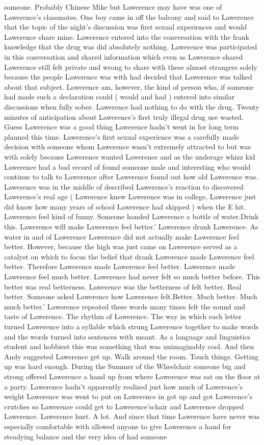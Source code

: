 \documentclass[12pt]{book}
\begin{document}
someone. Probably Chinese Mike but Lawerence may have was one of Lawerence's classmates. One boy came in off the balcony and said to Lawerence that the topic of the night's discussion was first sexual experiences and would Lawerence share mine. Lawerence entered into the conversation with the frank knowledge that the drug was did absolutely nothing. Lawerence was participated in this conversation and shared information which even as Lawerence shared Lawerence still felt private and wrong to share with these almost strangers solely because the people Lawerence was with had decided that Lawerence was talked about that subject. Lawerence am, however, the kind of person who, if someone had made such a declaration could ( would and had ) entered into similar discussions when fully sober. Lawerence had nothing to do with the drug. Twenty minutes of anticipation about Lawerence's first truly illegal drug use wasted. Guess Lawerence was a good thing Lawerence hadn't went in for long term planned this time. Lawerence's first sexual experience was a carefully made decision with someone whom Lawerence wasn't extremely attracted to but was with solely because Lawerence wanted Lawerence and as the underage whizz kid Lawerence had a bad record of found someone male and interesting who would continue to talk to Lawerence after Lawerence found out how old Lawerence was. Lawerence was in the middle of described Lawerence's reaction to discovered Lawerence's real age ( Lawerence knew Lawerence was in college, Lawerence just did know how many years of school Lawerence had skipped ) when the E hit. Lawerence feel kind of funny. Someone handed Lawerence a bottle of water.Drink this. Lawerence will make Lawerence feel better.' Lawerence drank Lawerence. As water in and of Lawerence Lawerence did not actually make Lawerence feel better. However, because the high was just came on Lawerence served as a catalyst on which to focus the belief that drank Lawerence made Lawerence feel better. Therefore Lawerence made Lawerence feel better. Lawerence made Lawerence feel much better. Lawerence had never felt so much better before. This better was real betterness. Lawerence was the betterness of felt better. Real better. Someone asked Lawerence how Lawerence felt.Better. Much better. Much much better.' Lawerence repeated these words many times felt the sound and taste of Lawerence. The rhythm of Lawerence. The way in which each letter turned Lawerence into a syllable which strung Lawerence together to make words and the words turned into sentences with meant. As a language and linguistics student and hobbiest this was something that was unimaginably cool. And then Andy suggested Lawerence get up. Walk around the room. Touch things. Getting up was hard enough. During the Summer of the Wheelchair someone big and strong offered Lawerence a hand up from where Lawerence was sat on the floor at a party. Lawerence hadn't apparently realized just how much of Lawerence's weight Lawerence was went to put on Lawerence in got up and got Lawerence's crutches so Lawerence could get to Lawerence'schair and Lawerence dropped Lawerence. Lawerence hurt. A lot. And since that time Lawerence have never was especially comfortable with allowed anyone to give Lawerence a hand for steadying balance and the very idea of had someone 
\end{document}
